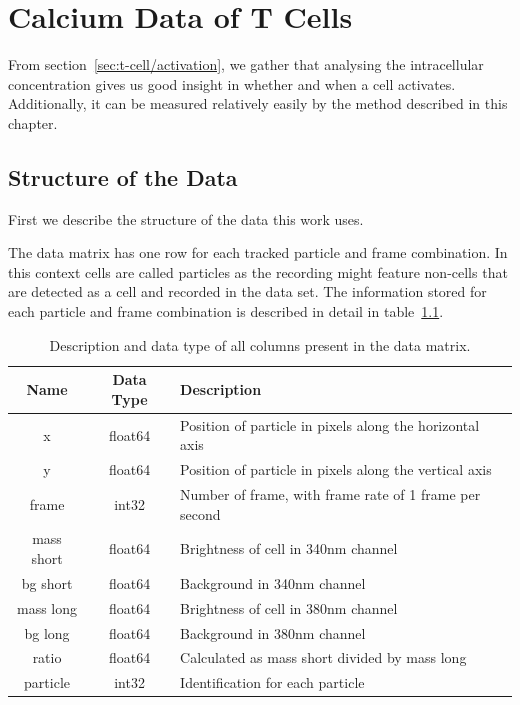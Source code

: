 \chapter{Calcium Data of T Cells}
\label{chapter:data}

From section~\ref{sec:t-cell/activation}, we gather that analysing the intracellular \Calcium concentration gives us good insight in whether and when a cell activates. Additionally, it can be measured relatively easily by the method described in this chapter.

\section{Structure of the Data}
\label{sec:structure_of_data}

First we describe the structure of the data this work uses. 

The data matrix has one row for each tracked particle and frame combination. In this context cells are called particles as the recording might feature non-cells that are detected as a cell and recorded in the data set. The information stored for each particle and frame combination is described in detail in table~\ref{tab:information_data_matrix}.

\begin{table}[h!]
	\centering
	\begin{tabular}{|c|c|l|}
		\hline
		\textbf{Name} & \textbf{Data Type} & \textbf{Description} \\
		\hline
		x & float64 & Position of particle in pixels along the horizontal axis \\
		\hline
		y & float64 & Position of particle in pixels along the vertical axis \\
		\hline
		frame & int32 & Number of frame, with frame rate of 1 frame per second \\
		\hline
		mass short & float64 & Brightness of cell in 340nm channel \\
		\hline
		bg short & float64 & Background in 340nm channel \\
		\hline
		mass long & float64 & Brightness of cell in 380nm channel \\
		\hline
		bg long & float64 & Background in 380nm channel \\
		\hline
		ratio & float64 & Calculated as mass short divided by mass long \\
		\hline
		particle & int32 & Identification for each particle \\
		\hline
	\end{tabular}
	\caption{Description and data type of all columns present in the data matrix.}
	\label{tab:information_data_matrix}
\end{table}

